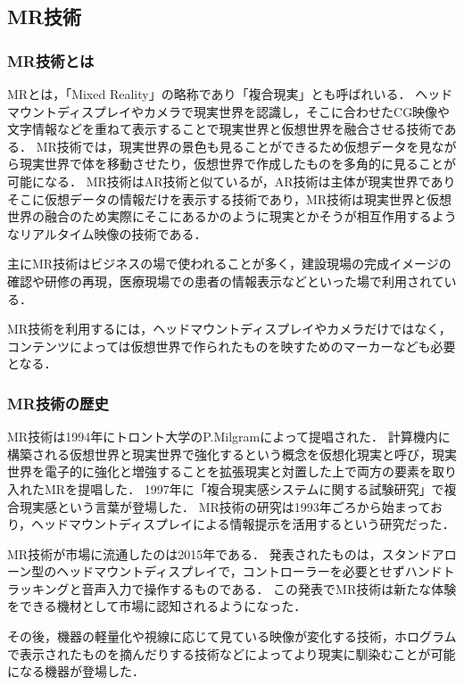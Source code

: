 \documentclass[12pt,a4j]{ltjsarticle}
\begin{document}
\subsection{MR技術}
\subsubsection{MR技術とは}
MRとは，「Mixed Reality」の略称であり「複合現実」とも呼ばれいる．
ヘッドマウントディスプレイやカメラで現実世界を認識し，そこに合わせたCG映像や文字情報などを重ねて表示することで現実世界と仮想世界を融合させる技術である．
MR技術では，現実世界の景色も見ることができるため仮想データを見ながら現実世界で体を移動させたり，仮想世界で作成したものを多角的に見ることが可能になる．
MR技術はAR技術と似ているが，AR技術は主体が現実世界でありそこに仮想データの情報だけを表示する技術であり，MR技術は現実世界と仮想世界の融合のため実際にそこにあるかのように現実とかそうが相互作用するようなリアルタイム映像の技術である\cite{MRとは}．

主にMR技術はビジネスの場で使われることが多く，建設現場の完成イメージの確認や研修の再現，医療現場での患者の情報表示などといった場で利用されている．

MR技術を利用するには，ヘッドマウントディスプレイやカメラだけではなく，コンテンツによっては仮想世界で作られたものを映すためのマーカーなども必要となる．

\subsubsection{MR技術の歴史}
MR技術は1994年にトロント大学のP.Milgramによって提唱された．
計算機内に構築される仮想世界と現実世界で強化するという概念を仮想化現実と呼び，現実世界を電子的に強化と増強することを拡張現実と対置した上で両方の要素を取り入れたMRを提唱した．
1997年に「複合現実感システムに関する試験研究」で複合現実感という言葉が登場した．
MR技術の研究は1993年ごろから始まっており，ヘッドマウントディスプレイによる情報提示を活用するという研究だった\cite{MRの歴史1}．

MR技術が市場に流通したのは2015年である．
発表されたものは，スタンドアローン型のヘッドマウントディスプレイで，コントローラーを必要とせずハンドトラッキングと音声入力で操作するものである．
この発表でMR技術は新たな体験をできる機材として市場に認知されるようになった\cite{MRの歴史2}．

その後，機器の軽量化や視線に応じて見ている映像が変化する技術，ホログラムで表示されたものを摘んだりする技術などによってより現実に馴染むことが可能になる機器が登場した．
\end{document}
